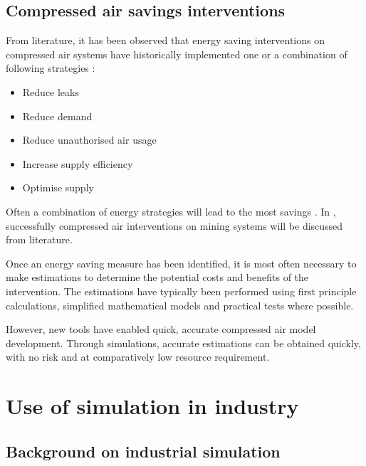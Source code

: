 	\subsection{Compressed air savings interventions}
		From literature, it has been observed that energy saving interventions on compressed air systems have historically implemented one or a combination of following strategies \cite{Snyman2011Masters}:
		\begin{itemize}
			\item Reduce leaks
			\item Reduce demand
			\item Reduce unauthorised air usage
			\item Increase supply efficiency
			\item Optimise supply
		\end{itemize}
	 Often a combination of energy strategies will lead to the most savings \cite{Marais2012PhD}. In , successfully compressed air interventions on mining systems will be discussed from literature.
	 \par 
	 Once an energy saving measure has been identified, it is most often necessary to make estimations to determine the potential costs and benefits of the intervention. The estimations have typically been performed using first principle calculations, simplified mathematical models and practical tests where possible. 
	 \par 
	 However, new tools have enabled quick, accurate compressed air model development. Through simulations, accurate estimations can be obtained quickly, with no risk and at comparatively low resource requirement.
\section{Use of simulation in industry }
	\subsection{Background on industrial simulation}
	
